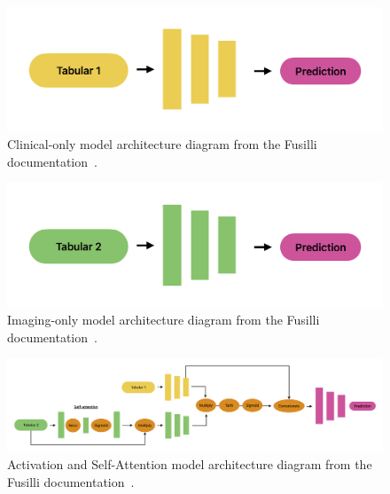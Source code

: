 \begin{figure}[h]
    \centering
    \includegraphics[width=0.8\linewidth]{figures//diagrams/Tabular1Unimodal}
    \caption[Clinical-only model architecture diagram.]{Clinical-only model architecture diagram from the Fusilli documentation~\cite{townendFlorencejtFusilliFusilli2024}.}
    \label{fig:tabular1}
\end{figure}

\begin{figure}[h]
    \centering
    \includegraphics[width=0.8\linewidth]{figures//diagrams/Tabular2Unimodal}
    \caption[Imaging-only model architecture diagram.]{Imaging-only model architecture diagram from the Fusilli documentation~\cite{townendFlorencejtFusilliFusilli2024}.}
    \label{fig:tabular2}
\end{figure}

\begin{figure}[h]
    \centering
    \includegraphics[width=1\linewidth]{figures//diagrams/ActivationandSelfAttention}
    \caption[Activation and Self-Attention model architecture diagram.]{Activation and Self-Attention model architecture diagram from the Fusilli documentation~\cite{townendFlorencejtFusilliFusilli2024}.}
    \label{fig:activationandselfattention}
\end{figure}


